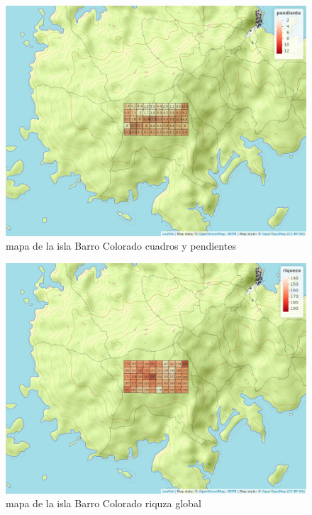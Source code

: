 \documentclass[11pt,]{article}
\begin{document}
\begin{figure}
\centering
\includegraphics[width=1.00000\textwidth]{mapa_cuadros_pendiente.png}
\caption{mapa de la isla Barro Colorado cuadros y pendientes
\label{fig:bci_map}}
\end{figure}

\begin{figure}
\centering
\includegraphics[width=1.00000\textwidth]{mapa_cuadros_riq_global.png}
\caption{mapa de la isla Barro Colorado riquza global
\label{fig:bci_map}}
\end{figure}
\end{document}
